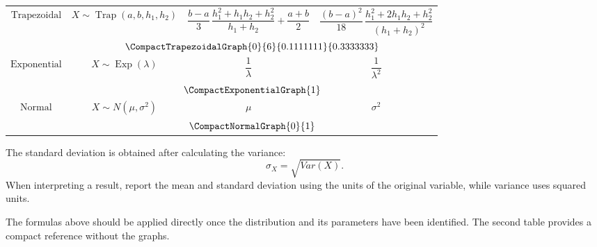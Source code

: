 {\begin{longtable}{c|c|c|c}
			\newpage
			
			$\text{Trapezoidal}$
			&
			$X\sim \operatorname{Trap}(a,b,h_1,h_2)$
			&
			$\dfrac{b-a}{3}\,
			\dfrac{h_1^2+h_1h_2+h_2^2}{h_1+h_2}
			+\dfrac{a+b}{2}$
			&
			$\dfrac{(b-a)^2}{18}\,
			\dfrac{h_1^2+2h_1h_2+h_2^2}{(h_1+h_2)^2}$
			\\[2mm]
			
			&
			\multicolumn{3}{c}{
				$\vcenter{\hbox{
						\CompactTrapezoidalGraph{0}{6}{0.1111111}{0.3333333}
				}}$
			}
			\\[5mm]
			\hline
			
			$\text{Exponential}$
			&
			$X\sim \operatorname{Exp}(\lambda)$
			&
			$\dfrac{1}{\lambda}$
			&
			$\dfrac{1}{\lambda^2}$
			\\[2mm]
			
			&
			\multicolumn{3}{c}{
				$\vcenter{\hbox{\CompactExponentialGraph{1}}}$
			}
			\\[5mm]
			\hline
			
			$\text{Normal}$
			&
			$X\sim N(\mu,\sigma^2)$
			&
			$\mu$
			&
			$\sigma^2$
			\\[2mm]
			
			&
			\multicolumn{3}{c}{
				$\vcenter{\hbox{\CompactNormalGraph{0}{1}}}$
			}
			
		\end{longtable}
	}
	
	The standard deviation is obtained after calculating the variance:
	\[
	\sigma_X=\sqrt{Var(X)}.
	\]
	When interpreting a result, report the mean and standard deviation using the
	units of the original variable, while variance uses squared units.
	
	The formulas above should be applied directly once the distribution and its
	parameters have been identified.  The second table provides a compact
	reference without the graphs.
	
